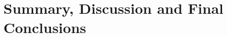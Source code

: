 \documentclass{../Dissertate}
\begin{document}
\doublespacing

\setcounter{chapter}{6}
\chapter{Summary, Discussion and Final Conclusions}









\end{document}
